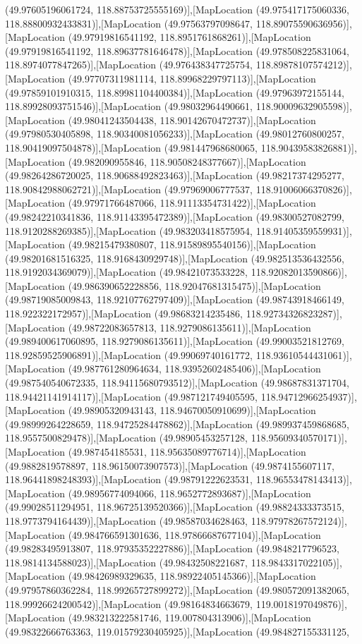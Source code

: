 (49.97605196061724, 118.88753725555169)],[MapLocation (49.975417175060336, 118.88800932433831)],[MapLocation (49.97563797098647, 118.89075590636956)],[MapLocation (49.97919816541192, 118.8951761868261)],[MapLocation (49.97919816541192, 118.89637781646478)],[MapLocation (49.978508225831064, 118.8974077847265)],[MapLocation (49.976438347725754, 118.89878107574212)],[MapLocation (49.97707311981114, 118.89968229797113)],[MapLocation (49.97859101910315, 118.89981104400384)],[MapLocation (49.97963972155144, 118.89928093751546)],[MapLocation (49.98032964490661, 118.90009632905598)],[MapLocation (49.98041243504438, 118.90142670472737)],[MapLocation (49.97980530405898, 118.90340081056233)],[MapLocation (49.98012760800257, 118.90419097504878)],[MapLocation (49.981447968680065, 118.90439583826881)],[MapLocation (49.982090955846, 118.90508248377667)],[MapLocation (49.98264286720025, 118.90688492823463)],[MapLocation (49.98217374295277, 118.90842988062721)],[MapLocation (49.97969006777537, 118.91006066370826)],[MapLocation (49.97971766487066, 118.91113354731422)],[MapLocation (49.98242210341836, 118.91143395472389)],[MapLocation (49.98300527082799, 118.9120288269385)],[MapLocation (49.983203418575954, 118.91405359559931)],[MapLocation (49.98215479380807, 118.91589895540156)],[MapLocation (49.98201681516325, 118.9168430929748)],[MapLocation (49.982513536432556, 118.9192034369079)],[MapLocation (49.98421073533228, 118.92082013590866)],[MapLocation (49.986390652228856, 118.92047681315475)],[MapLocation (49.98719085009843, 118.92107762797409)],[MapLocation (49.98743918466149, 118.922322172957)],[MapLocation (49.98683214235486, 118.92734326823287)],[MapLocation (49.98722083657813, 118.9279086135611)],[MapLocation (49.989400617060895, 118.9279086135611)],[MapLocation (49.99003521812769, 118.92859525906891)],[MapLocation (49.99069740161772, 118.93610544431061)],[MapLocation (49.987761280964634, 118.93952602485406)],[MapLocation (49.987540540672335, 118.94115680793512)],[MapLocation (49.98687831371704, 118.94421141914117)],[MapLocation (49.987121749405595, 118.94712966254937)],[MapLocation (49.98905320943143, 118.94670050910699)],[MapLocation (49.98999264228659, 118.94725284478862)],[MapLocation (49.989937459868685, 118.9557500829478)],[MapLocation (49.98905453257128, 118.95609340570171)],[MapLocation (49.987454185531, 118.95635089776714)],[MapLocation (49.9882819578897, 118.96150073907573)],[MapLocation (49.9874155607117, 118.96441898248393)],[MapLocation (49.98791222623531, 118.96553478143413)],[MapLocation (49.98956774094066, 118.9652772893687)],[MapLocation (49.99028511294951, 118.96725139520366)],[MapLocation (49.98824333373515, 118.9773794164439)],[MapLocation (49.98587034628463, 118.97978267572124)],[MapLocation (49.984766591301636, 118.97866687677104)],[MapLocation (49.98283495913807, 118.97935352227886)],[MapLocation (49.9848217796523, 118.9814134588023)],[MapLocation (49.98432508221687, 118.9843317022105)],[MapLocation (49.98426989329635, 118.98922405145366)],[MapLocation (49.97957860362284, 118.99265727899272)],[MapLocation (49.980572091382065, 118.99926624200542)],[MapLocation (49.98164834663679, 119.0018197049876)],[MapLocation (49.983213222581746, 119.007804313906)],[MapLocation (49.98322666763363, 119.01579230405925)],[MapLocation (49.984827155331125, 